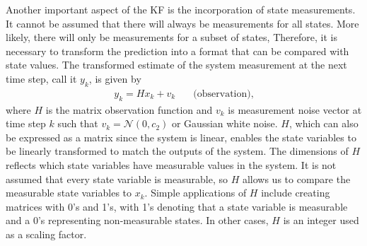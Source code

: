 \noindent Another important aspect of the KF is the incorporation of state measurements. It cannot be assumed that there will always be measurements for all states. More likely, there will only be measurements for a subset of states, Therefore, it is necessary to transform the prediction into a format that can be compared with state values. The transformed estimate of the system measurement at the next time step, call it $y_{k}$, is given by 
\begin{align*}
	y_{k} = H x_{k} + v_{k} \quad &\text{(observation)} ,
\end{align*}
where $H$ is the matrix observation function and $v_k$ is measurement noise vector at time step $k$ such that $v_k = \mathcal{N}(0, c_2)$ or Gaussian white noise. $H$, which can also be expressed as a matrix since the system is linear, enables the state variables to be linearly transformed to match the outputs of the system. The dimensions of $H$ reflects which state variables have measurable values in the system. It is not assumed that every state variable is measurable, so $H$ allows us to compare the measurable state variables to $x_k$. Simple applications of $H$ include creating matrices with 0's and 1's, with 1's denoting that a state variable is measurable and a 0's representing non-measurable states. In other cases, $H$ is an integer used as a scaling factor. \\ 





